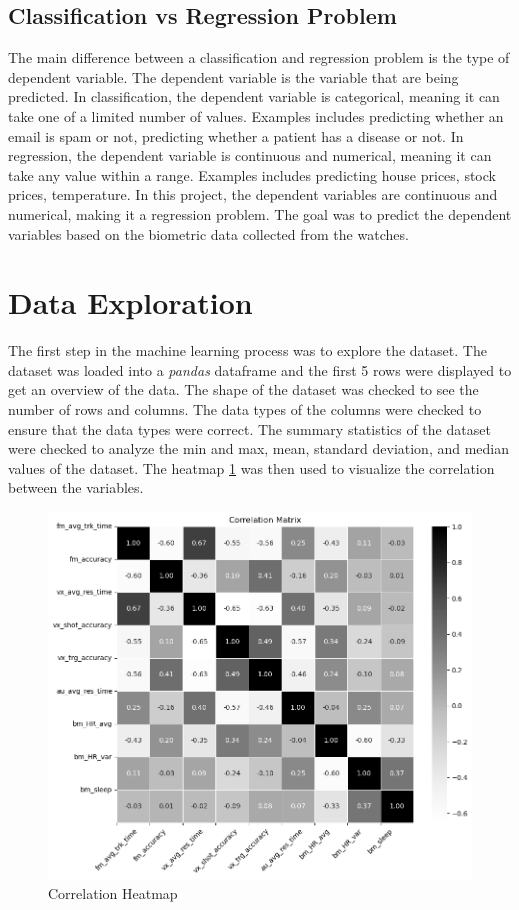 \subsection*{Classification vs Regression Problem}
The main difference between a classification and regression problem is the type of dependent variable. The dependent variable is the variable that are being predicted. In
classification, the dependent variable is categorical, meaning it can take one of a limited number of values. Examples includes predicting whether an email is spam or not,
predicting whether a patient has a disease or not. In regression, the dependent variable is continuous and numerical, meaning it can take any value within a range. Examples
includes predicting house prices, stock prices, temperature. In this project, the dependent variables are continuous and numerical, making it a regression problem. The goal
was to predict the dependent variables based on the biometric data collected from the watches.

\section{Data Exploration}
The first step in the machine learning process was to explore the dataset. The dataset was loaded into a \textit{pandas} dataframe and the first 5 rows were displayed to get an overview of the
data. The shape of the dataset was checked to see the number of rows and columns. The data types of the columns were checked to ensure that the data types were correct. The summary
statistics of the dataset were checked to analyze the min and max, mean, standard deviation, and median values of the dataset. The heatmap \ref{fig:correlation_heatmap} was then used to
visualize the correlation between the variables.

\begin{figure}[H]
    \centering
    \includegraphics[width=1\textwidth]{images/regressionCharts/corr_matrix.png}
    \caption{Correlation Heatmap}
    \label{fig:correlation_heatmap}
\end{figure}

